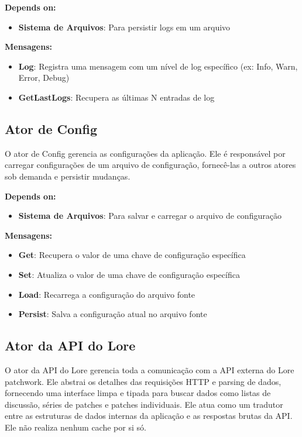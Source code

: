 \textbf{Depends on:}

\begin{itemize}
    \item \textbf{Sistema de Arquivos}: Para persistir logs em um arquivo
\end{itemize}

\textbf{Mensagens:}

\begin{itemize}
    \item \textbf{Log}: Registra uma mensagem com um nível de log específico (ex: Info, Warn, Error, Debug)
    \item \textbf{GetLastLogs}: Recupera as últimas N entradas de log
\end{itemize}

\subsection{Ator de Config}

O ator de Config gerencia as configurações da aplicação. Ele é responsável por carregar configurações de um arquivo de configuração, fornecê-las a outros atores sob demanda e persistir mudanças.

\textbf{Depends on:}

\begin{itemize}
    \item \textbf{Sistema de Arquivos}: Para salvar e carregar o arquivo de configuração
\end{itemize}

\textbf{Mensagens:}

\begin{itemize}
    \item \textbf{Get}: Recupera o valor de uma chave de configuração específica
    \item \textbf{Set}: Atualiza o valor de uma chave de configuração específica
    \item \textbf{Load}: Recarrega a configuração do arquivo fonte
    \item \textbf{Persist}: Salva a configuração atual no arquivo fonte
\end{itemize}

\subsection{Ator da API do Lore}

O ator da API do Lore gerencia toda a comunicação com a API externa do Lore patchwork. Ele abstrai os detalhes das requisições HTTP e parsing de dados, fornecendo uma interface limpa e tipada para buscar dados como listas de discussão, séries de patches e patches individuais. Ele atua como um tradutor entre as estruturas de dados internas da aplicação e as respostas brutas da API. Ele não realiza nenhum cache por si só.

